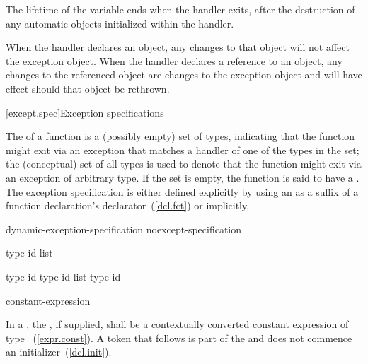 The lifetime of the variable ends
when the handler exits, after the
destruction of any automatic objects initialized
within the handler.

\pnum
When the handler declares an object,
any changes to that object will not affect the exception object.
When the handler declares a reference to an object,
any changes to the referenced object are changes to the
exception object and will have effect should that object be rethrown.%
%

[except.spec]{Exception specifications}%

\pnum
{}%
The  of a function
is a (possibly empty) set of types,
indicating that the function might exit
via an exception
that matches a handler of one of the types in the set;
the (conceptual) set of all types is used
to denote that the function might exit
via an exception
of arbitrary type.
If the set is empty,
the function is said to have
a .
The exception specification
is either defined explicitly
by using an 
as a suffix of a function declaration's declarator~(\ref{dcl.fct})
or implicitly.

\begin{bnf}
\br
    dynamic-exception-specification\br
    noexcept-specification
\end{bnf}

\begin{bnf}
\br
     type-id-list\opt{} \terminal{)}
\end{bnf}

\begin{bnf}
\br
    type-id \opt\br
    type-id-list \terminal{,} type-id \opt
\end{bnf}

\begin{bnf}
\br
     \terminal{(} constant-expression \terminal{)}\br
\end{bnf}

%
In a , the ,
if supplied, shall be a contextually converted constant expression
of type ~(\ref{expr.const}).
A \tcode{(} token that follows  is part of the
 and does not commence an
initializer~(\ref{dcl.init}).

